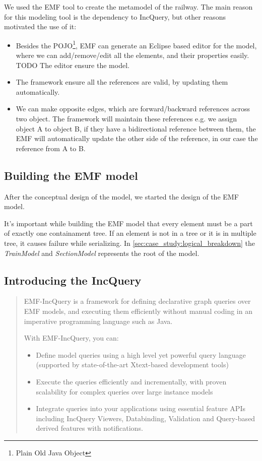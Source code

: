 We used the EMF tool to create the metamodel of the railway. The main reason for this modeling tool is the dependency to IncQuery, but other reasons motivated the use of it:
\begin{itemize}
	\item Besides the POJO\footnote{Plain Old Java Object}, EMF can generate an Eclipse based editor for the model, where we can add/remove/edit all the elements, and their properties easily. TODO The editor ensure the model.
	\item The framework ensure all the references are valid, by updating them automatically.
	\item We can make opposite edges, which are forward/backward references across two object. The framework will maintain these references e.g. we assign object A to object B, if they have a bidirectional reference between them, the EMF will automatically update the other side of the reference, in our case the reference from A to B.
\end{itemize}

\subsection{Building the EMF model}

After the conceptual design of the model, we started the design of the EMF model.

It's important while building the EMF model that every element must be a part of exactly one containament tree. If an element is not in a tree or it is in multiple tree, it causes failure while serializing. In \cref{sec:case_study:logical_breakdown} the \emph{TrainModel} and \emph{SectionModel} represents the root of the model.

\subsection{Introducing the IncQuery}

\begin{quotation}
	EMF-IncQuery is a framework for defining declarative graph queries over EMF models, and executing them efficiently without manual coding in an imperative programming language such as Java.

	With EMF-IncQuery, you can:
	\begin{itemize}
		\item Define model queries using a high level yet powerful query language (supported by state-of-the-art Xtext-based development tools)
		\item Execute the queries efficiently and incrementally, with proven scalability for complex queries over large instance models
		\item Integrate queries into your applications using essential feature APIs including IncQuery Viewers, Databinding, Validation and Query-based derived features with notifications.
	\end{itemize}
\end{quotation}

